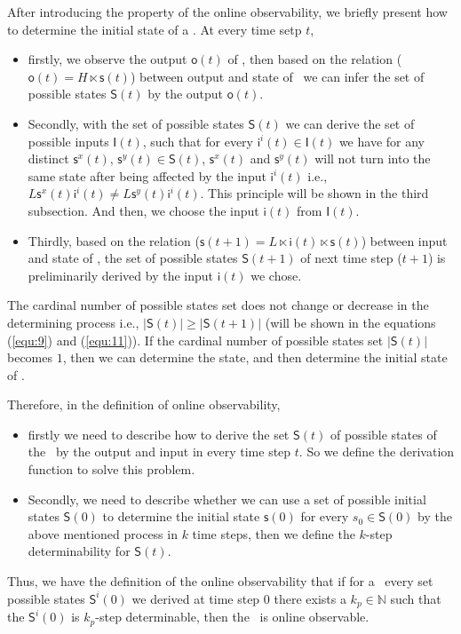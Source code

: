 After introducing the property of the online observability, we briefly present how to determine the initial state of a \BCN. At every time setp $t$, 
\begin{itemize}
\item firstly, we observe the output $\mathsf{o}(t)$ of \BCN, then based on the relation ($\mathsf{o}(t)= H\ltimes{\mathsf{s}(t)}$) between output and state of \BCN\ we can infer the set of possible states $\mathsf{S}(t)$ by the output $\mathsf{o}(t)$.
\item Secondly, with the set of possible states $\mathsf{S}(t)$ we can derive the set of possible inputs $\mathsf{I}(t)$, such that for every $\mathsf{i}^{i}(t)\in \mathsf{I}(t)$ we have  for any distinct $\mathsf{s}^{x}(t)$, $\mathsf{s}^{y}(t) \in \mathsf{S}(t)$, $\mathsf{s}^{x}(t)$ and $\mathsf{s}^{y}(t)$ will not turn into the same state after being affected by the input $\mathsf{i}^{i}(t)$ i.e., $L\mathsf{s}^{x}(t) \mathsf{i}^{i}(t)\neq L\mathsf{s}^{y}(t) \mathsf{i}^{i}(t)$. This principle will be shown in the third subsection.  And then, we choose the input $\mathsf{i}(t)$ from $\mathsf{I}(t)$.
\item Thirdly, based on the relation ($\mathsf{s}(t+1)= L\ltimes{\mathsf{i}(t)}\ltimes{\mathsf{s}(t)}$) between input and state of \BCN, the set of possible states $\mathsf{S}(t+1)$ of next time step ($t+1$) is preliminarily derived by the input $\mathsf{i}(t)$ we chose. 
\end{itemize} 
 The cardinal number of possible states set does not change or decrease in the determining process i.e., $|\mathsf{S}(t)|\ge|\mathsf{S}(t+1)|$ (will be shown in the equations (\ref{equ:9}) and (\ref{equ:11})). If the cardinal number of possible states set $|\mathsf{S}(t)|$ becomes $1$, then we can determine the state, and then determine the initial state of \BCN. 

Therefore, in the definition of online observability, 
\begin{itemize}
\item firstly we need to describe how to derive the set $\mathsf{S}(t)$ of possible states of the \BCN\ by the output and input in every time step $t$. So we define the derivation function to solve this problem.
\item  Secondly, we need to describe whether we can use a set of possible initial states $\mathsf{S}(0)$ to determine the initial state $\mathsf{s}(0)$ for every $s_0 \in \mathsf{S}(0)$ by the above mentioned process in $k$ time steps, then we define the $k$-step determinability for $\mathsf{S}(t)$. 
\end{itemize} 
Thus, we have the definition of the online observability that if for a \BCN\ every set possible states $\mathsf{S}^{i}(0)$ we derived at time step $0$ there exists a $k_p\in \mathbb{N}$ such that the $\mathsf{S}^{i}(0)$ is $k_p$-step determinable, then the \BCN\ is online observable.

